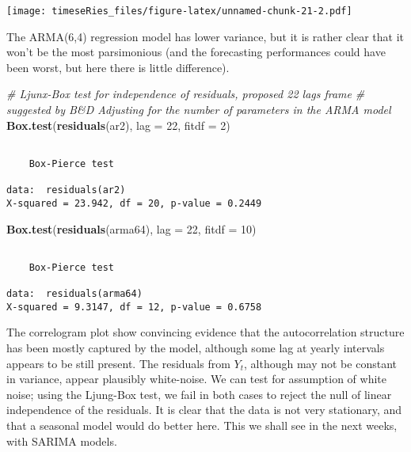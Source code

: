 \documentclass[]{book}
\newenvironment{Shaded}{\begin{snugshade}}{\end{snugshade}}
\newcommand{\CommentTok}[1]{\textcolor[rgb]{0.56,0.35,0.01}{\textit{#1}}}
\newcommand{\DataTypeTok}[1]{\textcolor[rgb]{0.13,0.29,0.53}{#1}}
\newcommand{\DecValTok}[1]{\textcolor[rgb]{0.00,0.00,0.81}{#1}}
\newcommand{\KeywordTok}[1]{\textcolor[rgb]{0.13,0.29,0.53}{\textbf{#1}}}
\newcommand{\NormalTok}[1]{#1}
\begin{document}
\texttt{[image: timeseRies\_files/figure-latex/unnamed-chunk-21-2.pdf]}

The ARMA(6,4) regression model has lower variance, but it is rather
clear that it won't be the most parsimonious (and the forecasting
performances could have been worst, but here there is little
difference).

\begin{Shaded}
\begin{Highlighting}[]
\CommentTok{# Ljunx-Box test for independence of residuals, proposed 22 lags frame}
\CommentTok{# suggested by B&D Adjusting for the number of parameters in the ARMA model}
\KeywordTok{Box.test}\NormalTok{(}\KeywordTok{residuals}\NormalTok{(ar2), }\DataTypeTok{lag =} \DecValTok{22}\NormalTok{, }\DataTypeTok{fitdf =} \DecValTok{2}\NormalTok{)}
\end{Highlighting}
\end{Shaded}

\begin{verbatim}

    Box-Pierce test

data:  residuals(ar2)
X-squared = 23.942, df = 20, p-value = 0.2449
\end{verbatim}

\begin{Shaded}
\begin{Highlighting}[]
\KeywordTok{Box.test}\NormalTok{(}\KeywordTok{residuals}\NormalTok{(arma64), }\DataTypeTok{lag =} \DecValTok{22}\NormalTok{, }\DataTypeTok{fitdf =} \DecValTok{10}\NormalTok{)}
\end{Highlighting}
\end{Shaded}

\begin{verbatim}

    Box-Pierce test

data:  residuals(arma64)
X-squared = 9.3147, df = 12, p-value = 0.6758
\end{verbatim}

The correlogram plot show convincing evidence that the autocorrelation
structure has been mostly captured by the model, although some lag at
yearly intervals appears to be still present. The residuals from
\(Y_t\), although may not be constant in variance, appear plausibly
white-noise. We can test for assumption of white noise; using the
Ljung-Box test, we fail in both cases to reject the null of linear
independence of the residuals. It is clear that the data is not very
stationary, and that a seasonal model would do better here. This we
shall see in the next weeks, with SARIMA models.
\end{document}
